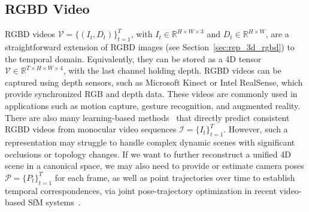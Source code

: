 \subsection{RGBD Video}
\label{sec:rep_4d_rgbd}
RGBD videos $\mathcal{V}=\{(I_t, D_t)\}_{t=1}^T$, with $I_t \in \mathbb{R}^{H \times W \times 3}$ and $D_t \in \mathbb{R}^{H \times W}$, are a straightforward extension of RGBD images (see Section~\ref{sec:rep_3d_rgbd}) to the temporal domain.
Equivalently, they can be stored as a 4D tensor $\mathcal{V} \in \mathbb{R}^{T \times H \times W \times 4}$, with the last channel holding depth.
RGBD videos can be captured using depth sensors, such as Microsoft Kinect or Intel RealSense, which provide synchronized RGB and depth data.
These videos are commonly used in applications such as motion capture, gesture recognition, and augmented reality.
There are also many learning-based methods~\cite{wang2023neural,hu2025depthcrafter,chen2025video} that directly predict consistent RGBD videos from monocular video sequences
$\mathcal{I}=\{I_t\}_{t=1}^T$.
However, such a representation may struggle to handle complex dynamic scenes with significant occlusions or topology changes.
If we want to further reconstruct a unified 4D scene in a canonical space, we may also need to provide or estimate camera poses
$
\mathcal{P}=\{P_t\}_{t=1}^T
$
for each frame, as well as point trajectories over time to establish temporal correspondences, \eg via joint pose-trajectory optimization in recent video-based SfM systems~\cite{li2025megasam}.






